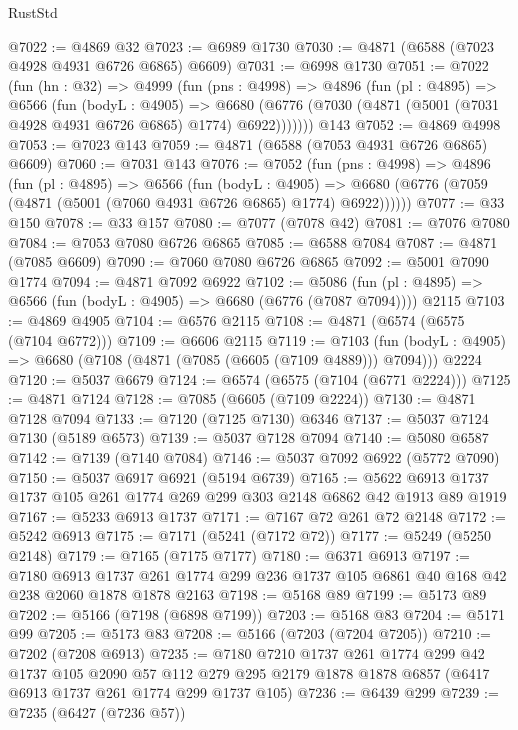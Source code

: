 \begin{lexlean}{RustStd}
\begin{coremodule}
@7022 := @4869 @32
@7023 := @6989 @1730
@7030 := @4871 (@6588 (@7023 @4928 @4931 @6726 @6865) @6609)
@7031 := @6998 @1730
@7051 := @7022
    (fun (hn : @32) =>
    @4999
      (fun (pns : @4998) =>
      @4896
        (fun (pl : @4895) =>
        @6566
          (fun (bodyL : @4905) =>
          @6680 (@6776 (@7030 (@4871 (@5001 (@7031 @4928 @4931 @6726 @6865) @1774) @6922)))))))
    @143
@7052 := @4869 @4998
@7053 := @7023 @143
@7059 := @4871 (@6588 (@7053 @4931 @6726 @6865) @6609)
@7060 := @7031 @143
@7076 := @7052
    (fun (pns : @4998) =>
    @4896
      (fun (pl : @4895) =>
      @6566
        (fun (bodyL : @4905) =>
        @6680 (@6776 (@7059 (@4871 (@5001 (@7060 @4931 @6726 @6865) @1774) @6922))))))
@7077 := @33 @150
@7078 := @33 @157
@7080 := @7077 (@7078 @42)
@7081 := @7076 @7080
@7084 := @7053 @7080 @6726 @6865
@7085 := @6588 @7084
@7087 := @4871 (@7085 @6609)
@7090 := @7060 @7080 @6726 @6865
@7092 := @5001 @7090 @1774
@7094 := @4871 @7092 @6922
@7102 := @5086
    (fun (pl : @4895) => @6566 (fun (bodyL : @4905) => @6680 (@6776 (@7087 @7094))))
    @2115
@7103 := @4869 @4905
@7104 := @6576 @2115
@7108 := @4871 (@6574 (@6575 (@7104 @6772)))
@7109 := @6606 @2115
@7119 := @7103
    (fun (bodyL : @4905) => @6680 (@7108 (@4871 (@7085 (@6605 (@7109 @4889))) @7094)))
    @2224
@7120 := @5037 @6679
@7124 := @6574 (@6575 (@7104 (@6771 @2224)))
@7125 := @4871 @7124
@7128 := @7085 (@6605 (@7109 @2224))
@7130 := @4871 @7128 @7094
@7133 := @7120 (@7125 @7130) @6346
@7137 := @5037 @7124 @7130 (@5189 @6573)
@7139 := @5037 @7128 @7094
@7140 := @5080 @6587
@7142 := @7139 (@7140 @7084)
@7146 := @5037 @7092 @6922 (@5772 @7090)
@7150 := @5037 @6917 @6921 (@5194 @6739)
@7165 := @5622 @6913 @1737 @1737 @105 @261 @1774 @269 @299 @303 @2148 @6862 @42 @1913 @89 @1919
@7167 := @5233 @6913 @1737
@7171 := @7167 @72 @261 @72 @2148
@7172 := @5242 @6913
@7175 := @7171 (@5241 (@7172 @72))
@7177 := @5249 (@5250 @2148)
@7179 := @7165 (@7175 @7177)
@7180 := @6371 @6913
@7197 := @7180
    @6913
    @1737
    @261
    @1774
    @299
    @236
    @1737
    @105
    @6861
    @40
    @168
    @42
    @238
    @2060
    @1878
    @1878
    @2163
@7198 := @5168 @89
@7199 := @5173 @89
@7202 := @5166 (@7198 (@6898 @7199))
@7203 := @5168 @83
@7204 := @5171 @99
@7205 := @5173 @83
@7208 := @5166 (@7203 (@7204 @7205))
@7210 := @7202 (@7208 @6913)
@7235 := @7180
    @7210
    @1737
    @261
    @1774
    @299
    @42
    @1737
    @105
    @2090
    @57
    @112
    @279
    @295
    @2179
    @1878
    @1878
    @6857
    (@6417 @6913 @1737 @261 @1774 @299 @1737 @105)
@7236 := @6439 @299
@7239 := @7235 (@6427 (@7236 @57))

\end{coremodule}
\end{lexlean}
